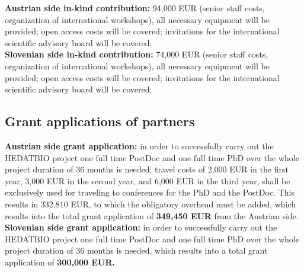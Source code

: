 \documentclass[a4paper,11pt]{article}
\begin{document}
\textbf{Austrian side in-kind contribution:} 94,000 EUR (senior staff costs, organization of international workshops), all necessary equipment will be provided; open access costs will be covered; invitations for the international scientific advisory board will be covered;
\\[0,2cm]
\textbf{Slovenian side in-kind contribution: }74,000 EUR (senior staff costs, organization of international workshops), all necessary equipment will be provided; open access costs will be covered; invitations for the international scientific advisory board will be covered;
\subsection{Grant applications of partners}
\textbf{Austrian side grant application:} in order to successfully carry out the HEDATBIO project one full time PostDoc and one full time PhD over the whole project duration of 36 months is needed; travel costs of 2,000 EUR in the first year, 3,000 EUR in the second year, and 6,000 EUR in the third year, shall be exclusively used for traveling to conferences for the PhD and the PostDoc. This results in 332,810 EUR, to which the obligatory overhead must be added, which results into the total grant application of \textbf{349,450 EUR} from the Austrian side.
\\[0,2cm]
\textbf{Slovenian side grant application:} in order to successfully carry out the HEDATBIO project one full time PostDoc and one full time PhD over the whole project duration of 36 months is needed, which results into a total grant application of \textbf{300,000 EUR.}

\end{document}

